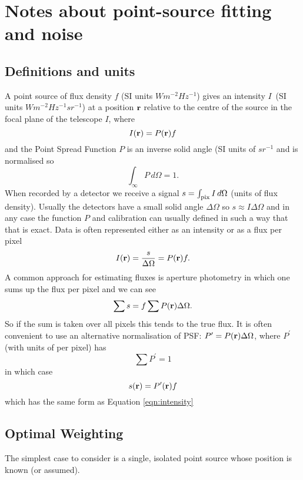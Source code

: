 \documentclass{article}
\begin{document}
\section{Notes about point-source fitting and noise}
\subsection{Definitions and units}
A point source of flux density $f$ (SI units $Wm^{-2}Hz^{-1}$) gives an intensity $I$~(SI units $Wm^{-2}Hz^{-1}sr^{-1}$) at a position ${\bf r}$ relative to the centre of the source in the focal plane of the telescope $I$, where 
\begin{equation} I({\bf r})=P({\bf r})f \label{eqn:intensity}\end{equation} and the Point Spread Function $P$ is an inverse solid angle (SI units of $sr^{-1}$ and is normalised so 
\begin{equation}\int_\infty P\, d\Omega=1.\label{eqn:intennorm}\end{equation}
When recorded by a detector we receive a signal  $s=\int_{\rm pix}{I}\,d\Omega$ (units of flux density). Usually the detectors have a small solid angle $\Delta\Omega$ so $s\approx I\Delta\Omega$ and in any case the function $P$ and calibration can usually defined in such a way that that is exact.  Data is often represented either as an intensity or as a flux per pixel
\begin{equation}
I({\bf r})=\frac{s}{\Delta{\Omega}}=P({\bf r})f.
\end{equation}
A common approach for estimating fluxes is aperture photometry in which one sums up the flux per pixel and we can see
\begin{equation}
\sum{s}=f\sum{P({\bf r})\Delta{\Omega}}.
\end{equation}
So if the sum is taken over all pixels this tends to the true flux.  It is often convenient to use an alternative normalisation of PSF:
$P^\prime=P({\bf r})\Delta{\Omega}$, where $P^\prime$ (with units of per pixel) has
\begin{equation}\sum P^\prime=1\label{eqn:fluxnorm}\end{equation} in which case 
\begin{equation}s({\bf r})=P^\prime({\bf r}) f\label{eqn:pix}\end{equation}
which has the same form as Equation \ref{eqn:intensity}

\subsection{Optimal Weighting}
The simplest case to consider is a single, isolated point source whose position is known (or assumed).  
\end{document}
